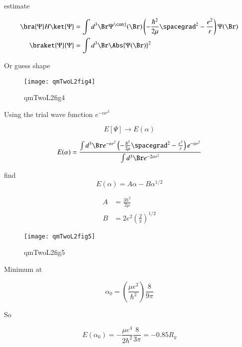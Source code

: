 estimate

\begin{align}\label{eqn:qmTwoL2:350}
\bra{\Psi} H \ket{\Psi} &= \int d^3 \Br \Psi^\conj(\Br) \left( -\frac{\hbar^2}{2 \mu} \spacegrad^2 - \frac{e^2}{r} \right) \Psi(\Br) \\
\braket{\Psi}{\Psi} &= \int d^3 \Br \Abs{\Psi(\Br)}^2
\end{align}

Or guess shape

\begin{figure}[htp]
\centering
\texttt{[image: qmTwoL2fig4]}
\caption{qmTwoL2fig4}\label{fig:qmTwoL2:4}
\end{figure}

Using the trial wave function $e^{-\alpha r^2}$

\begin{equation}\label{eqn:qmTwoL2:370}
E[\Psi] \rightarrow E(\alpha)
\end{equation}

\begin{equation}\label{eqn:qmTwoL2:390}
E(\alpha) =
\frac{\int d^3 \Br e^{-\alpha r^2} \left( -\frac{\hbar^2}{2 \mu} \spacegrad^2 - \frac{e^2}{r} \right) e^{-\alpha r^2}}{
\int d^3\Br e^{-2 \alpha r^2}
}
\end{equation}

find
\begin{equation}\label{eqn:qmTwoL2:410}
E(\alpha) = A \alpha - B \alpha^{1/2}
\end{equation}

\begin{align}\label{eqn:qmTwoL2:430}
A &= \frac{3 \hbar^2}{2\mu} \\
B &= 2 e^2 \left( \frac{2}{\pi} \right)^{1/2}
\end{align}

\begin{figure}[htp]
\centering
\texttt{[image: qmTwoL2fig5]}
\caption{qmTwoL2fig5}\label{fig:qmTwoL2:5}
\end{figure}

Minimum at

\begin{equation}\label{eqn:qmTwoL2:450}
\alpha_0 =
\left( \frac{\mu e^2}{ \hbar^2 } \right) \frac{8 }{9 \pi}
\end{equation}

So

\begin{equation}\label{eqn:qmTwoL2:470}
E(\alpha_0) =
- \frac{\mu e^4 }{2 \hbar^2} \frac{8 }{3 \pi} = -0.85 R_y
\end{equation}

